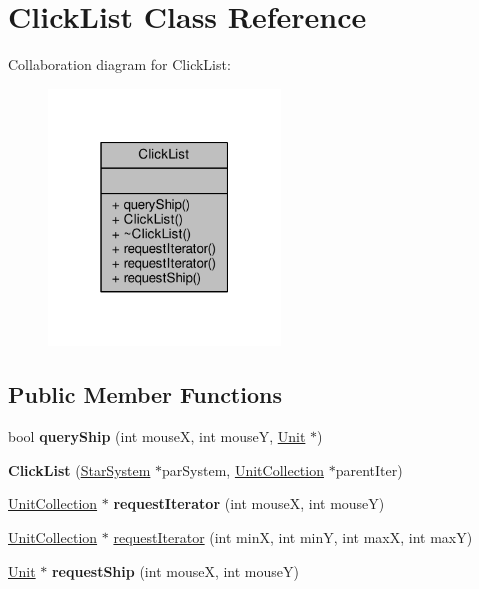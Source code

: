 \hypertarget{classClickList}{}\section{Click\+List Class Reference}
\label{classClickList}


Collaboration diagram for Click\+List\+:
\nopagebreak
\begin{figure}[H]
\begin{center}
\leavevmode
\includegraphics[width=175pt]{d3/de6/classClickList__coll__graph}
\end{center}
\end{figure}
\subsection*{Public Member Functions}
\begin{DoxyCompactItemize}
\item 
bool {\bfseries query\+Ship} (int mouseX, int mouseY, \hyperlink{classUnit}{Unit} $\ast$)\hypertarget{classClickList_afc6e23c4fc8845af80c866bdf7d35236}{}\label{classClickList_afc6e23c4fc8845af80c866bdf7d35236}

\item 
{\bfseries Click\+List} (\hyperlink{classStarSystem}{Star\+System} $\ast$par\+System, \hyperlink{classUnitCollection}{Unit\+Collection} $\ast$parent\+Iter)\hypertarget{classClickList_a651bef89842c673470b9438559636eaf}{}\label{classClickList_a651bef89842c673470b9438559636eaf}

\item 
\hyperlink{classUnitCollection}{Unit\+Collection} $\ast$ {\bfseries request\+Iterator} (int mouseX, int mouseY)\hypertarget{classClickList_aa099c7f4d82576e8b23eddb395892d40}{}\label{classClickList_aa099c7f4d82576e8b23eddb395892d40}

\item 
\hyperlink{classUnitCollection}{Unit\+Collection} $\ast$ \hyperlink{classClickList_ae98cf470a1844dcffd69037e22cf5461}{request\+Iterator} (int minX, int minY, int maxX, int maxY)
\item 
\hyperlink{classUnit}{Unit} $\ast$ {\bfseries request\+Ship} (int mouseX, int mouseY)\hypertarget{classClickList_ac698bc976fee27a61934b3c9a381110d}{}\label{classClickList_ac698bc976fee27a61934b3c9a381110d}

\end{DoxyCompactItemize}


